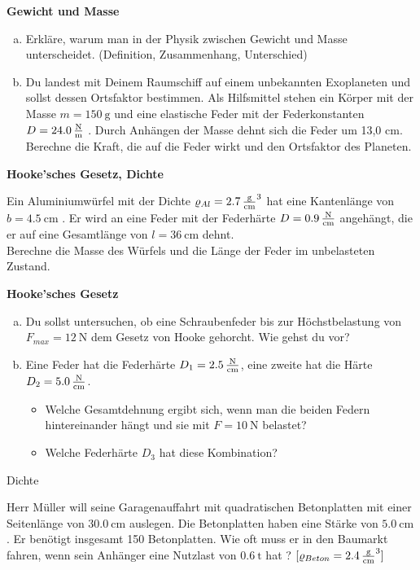 \documentclass[a4paper]{article}
\begin{document}
\begin{enumerate}[1.]
\item {\bf Gewicht und Masse}
\begin{enumerate}[a)]
\item Erkläre, warum man in der Physik zwischen Gewicht und Masse unterscheidet. (Definition, Zusammenhang, Unterschied)
\item Du landest mit Deinem Raumschiff auf einem unbekannten Exoplaneten und sollst dessen Ortsfaktor bestimmen. Als Hilfsmittel stehen ein Körper mit der Masse $m=\SI{150}{\gram}$ und eine elastische Feder mit der Federkonstanten $ D=\SI{24,0}{\newton\over\meter}$ . Durch Anhängen der Masse dehnt sich die Feder um 13,0 cm.\\
Berechne die Kraft, die auf die Feder wirkt und den Ortsfaktor des Planeten.
\end{enumerate}

\item {\bf Hooke'sches Gesetz, Dichte}

Ein Aluminiumwürfel mit der Dichte $ \varrho_{Al}=\SI{2,7}{\gram\over\centi\meter^3}$ hat eine Kantenlänge von
 $b=\SI{4,5}{\centi\meter}$ . Er wird an eine Feder mit der Federhärte $D=\SI{0,9}{\newton\over\centi\meter}$ angehängt, die er auf eine Gesamtlänge von  $l=\SI{36}{\centi\meter}$ dehnt. \\
Berechne die Masse des Würfels und die Länge der Feder im unbelasteten Zustand.


\item  {\bf Hooke'sches Gesetz}
\begin{enumerate}[a)]
\item Du sollst untersuchen, ob eine Schraubenfeder bis zur Höchstbelastung von $F_{max}=\SI{12}{\newton}$ dem Gesetz von Hooke gehorcht. Wie gehst du vor?
\item Eine Feder hat die Federhärte $ D_1=\SI{2,5}{\newton\over\centi\meter}$, eine zweite hat die Härte  $ D_2=\SI{5,0}{\newton\over \centi\meter}$. 
\begin{itemize}
\item Welche Gesamtdehnung ergibt sich, wenn man die beiden Federn hintereinander hängt und sie mit $F=\SI{10}{\newton}$ belastet?
\item Welche Federhärte $D_3$ hat diese Kombination?
\end{itemize}
\end{enumerate}


{\bf \item Dichte}

Herr Müller will seine Garagenauffahrt mit quadratischen Betonplatten mit einer Seitenlänge von $\SI{30,0}{\centi\meter}$ auslegen. Die Betonplatten haben eine Stärke von $\SI{5,0}{\centi\meter}$. Er benötigt insgesamt 150 Betonplatten.  Wie oft muss er in den Baumarkt fahren, wenn sein Anhänger eine Nutzlast von $\SI{0,6}{\tonne}$ hat ? $[ \varrho_{Beton}=\SI{2,4}{\gram\over \centi\meter^3} ]$

\end{enumerate} 
\end{document}
